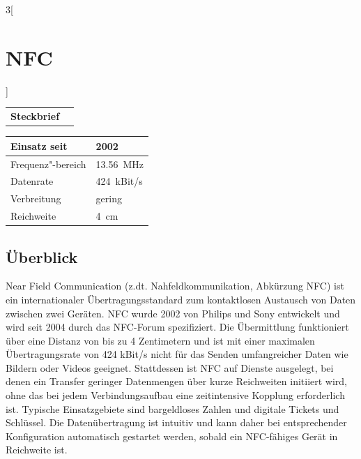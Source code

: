 \begin{multicols}{3}[\section{NFC}]


\newrefsegment

\begin{boxedminipage}{\linewidth}
\begin{tabular}{p{}p{2.7 cm}}
\textbf{Steckbrief}& \\
\end{tabular}
\begin{tabular}{p{}|p{2.7 cm}}
      Einsatz seit & 2002\\
      \hline
      Frequenz"-bereich  & \SI{13.56}{\mega\hertz}\\
      \hline
      Datenrate & \SI{424}{kBit/s}\\
      \hline
      Verbreitung & gering\\
      \hline
      Reichweite & \SI{4}{cm}\\
\end{tabular}
\end{boxedminipage}
\par


\subsection*{Überblick}
Near Field Communication (z.dt. Nahfeldkommunikation, Abkürzung NFC) ist ein internationaler Übertragungsstandard zum kontaktlosen Austausch von Daten zwischen zwei Geräten. NFC wurde 2002 von Philips und Sony entwickelt und wird seit 2004 durch das NFC-Forum spezifiziert. Die Übermittlung funktioniert über eine Distanz von bis zu 4 Zentimetern und ist mit einer maximalen Übertragungsrate von 424 kBit/s nicht für das Senden umfangreicher Daten wie Bildern oder Videos geeignet. Stattdessen ist NFC auf Dienste ausgelegt, bei denen ein Transfer geringer Datenmengen über kurze Reichweiten initiiert wird, ohne das bei jedem Verbindungsaufbau eine zeitintensive Kopplung erforderlich ist. Typische Einsatzgebiete sind bargeldloses Zahlen und digitale Tickets und Schlüssel.
Die Datenübertragung ist intuitiv und kann daher bei entsprechender Konfiguration automatisch gestartet werden, sobald ein NFC-fähiges Gerät in Reichweite ist.~\cite{nfc.1,nfc.2,nfc.12}


\end{multicols}
